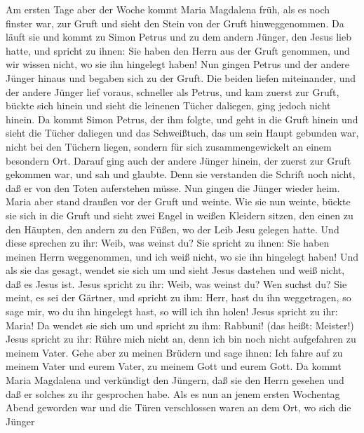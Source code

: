  Am ersten Tage aber der Woche kommt Maria Magdalena früh,
als es noch finster war, zur Gruft und sieht den Stein von der Gruft
hinweggenommen.  Da läuft sie und kommt zu Simon Petrus
und zu dem andern Jünger, den Jesus lieb hatte, und spricht zu ihnen:
Sie haben den Herrn aus der Gruft genommen, und wir wissen nicht, wo sie
ihn hingelegt haben!  Nun gingen Petrus und der andere
Jünger hinaus und begaben sich zu der Gruft.  Die beiden
liefen miteinander, und der andere Jünger lief voraus, schneller als
Petrus, und kam zuerst zur Gruft,  bückte sich hinein und
sieht die leinenen Tücher daliegen, ging jedoch nicht hinein.
 Da kommt Simon Petrus, der ihm folgte, und geht in die
Gruft hinein und sieht die Tücher daliegen  und das
Schweißtuch, das um sein Haupt gebunden war, nicht bei den Tüchern
liegen, sondern für sich zusammengewickelt an einem besondern Ort.
 Darauf ging auch der andere Jünger hinein, der zuerst zur
Gruft gekommen war, und sah und glaubte.  Denn sie
verstanden die Schrift noch nicht, daß er von den Toten auferstehen
müsse.  Nun gingen die Jünger wieder heim.
 Maria aber stand draußen vor der Gruft und weinte. Wie
sie nun weinte, bückte sie sich in die Gruft  und sieht
zwei Engel in weißen Kleidern sitzen, den einen zu den Häupten, den
andern zu den Füßen, wo der Leib Jesu gelegen hatte.  Und
diese sprechen zu ihr: Weib, was weinst du? Sie spricht zu ihnen: Sie
haben meinen Herrn weggenommen, und ich weiß nicht, wo sie ihn hingelegt
haben!  Und als sie das gesagt, wendet sie sich um und
sieht Jesus dastehen und weiß nicht, daß es Jesus ist. 
Jesus spricht zu ihr: Weib, was weinst du? Wen suchst du? Sie meint, es
sei der Gärtner, und spricht zu ihm: Herr, hast du ihn weggetragen, so
sage mir, wo du ihn hingelegt hast, so will ich ihn holen!
 Jesus spricht zu ihr: Maria! Da wendet sie sich um und
spricht zu ihm: Rabbuni! (das heißt: Meister!)  Jesus
spricht zu ihr: Rühre mich nicht an, denn ich bin noch nicht aufgefahren
zu meinem Vater. Gehe aber zu meinen Brüdern und sage ihnen: Ich fahre
auf zu meinem Vater und eurem Vater, zu meinem Gott und eurem Gott.
 Da kommt Maria Magdalena und verkündigt den Jüngern, daß
sie den Herrn gesehen und daß er solches zu ihr gesprochen habe.
 Als es nun an jenem ersten Wochentag Abend geworden war
und die Türen verschlossen waren an dem Ort, wo sich die Jünger
